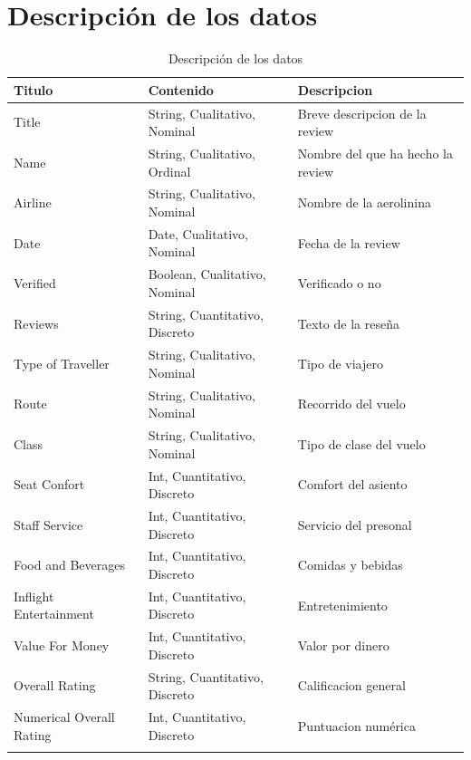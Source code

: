\documentclass{report}
\begin{document}
        \section{Descripción de los datos}
            \begin{longtable}{|p{4cm}|p{}|p{}|}
                \hline
                \textbf{Titulo} & \textbf{Contenido}& \textbf{Descripcion}\\
                \hline
                Title & String, Cualitativo, Nominal & Breve descripcion de la review\\
                \hline
                Name & String, Cualitativo, Ordinal & Nombre del que ha hecho la review\\
                \hline
                Airline & String, Cualitativo, Nominal & Nombre de la aerolinina\\
                \hline
                Date & Date, Cualitativo, Nominal & Fecha de la review\\
                \hline
                Verified & Boolean, Cualitativo, Nominal & Verificado o no\\
                \hline
                Reviews & String, Cuantitativo, Discreto & Texto de la reseña\\
                \hline
                Type of Traveller & String, Cualitativo, Nominal & Tipo de viajero\\
                \hline
                Route & String, Cualitativo, Nominal & Recorrido del vuelo\\
                \hline
                Class & String, Cualitativo, Nominal & Tipo de clase del vuelo\\
                \hline
                Seat Confort & Int, Cuantitativo, Discreto & Comfort del asiento\\
                \hline
                Staff Service & Int, Cuantitativo, Discreto & Servicio del presonal\\
                \hline
                Food and Beverages & Int, Cuantitativo, Discreto & Comidas y bebidas\\
                \hline
                Inflight Entertainment & Int, Cuantitativo, Discreto & Entretenimiento\\
                \hline
                Value For Money & Int, Cuantitativo, Discreto & Valor por dinero\\
                \hline
                Overall Rating & String, Cuantitativo, Discreto & Calificacion general\\
                \hline
                Numerical Overall Rating & Int, Cuantitativo, Discreto & Puntuacion numérica\\
                \hline
                \caption{Descripción de los datos}
            \end{longtable}
            
\end{document}
